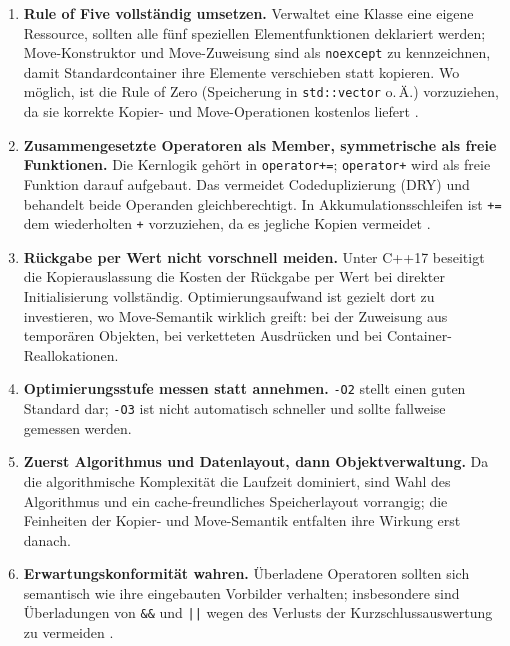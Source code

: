 \documentclass[10pt,a4paper]{article}
\begin{document}
\begin{enumerate}
  \item \textbf{Rule of Five vollständig umsetzen.} Verwaltet eine Klasse eine
  eigene Ressource, sollten alle fünf speziellen Elementfunktionen deklariert
  werden; Move-Konstruktor und Move-Zuweisung sind als \texttt{noexcept} zu
  kennzeichnen, damit Standardcontainer ihre Elemente verschieben statt
  kopieren. Wo möglich, ist die Rule of Zero (Speicherung in
  \texttt{std::vector} o.\,Ä.) vorzuziehen, da sie korrekte Kopier- und
  Move-Operationen kostenlos liefert \cite{meyers2014,coreguidelines}.
 
  \item \textbf{Zusammengesetzte Operatoren als Member, symmetrische als freie
  Funktionen.} Die Kernlogik gehört in \texttt{operator+=}; \texttt{operator+}
  wird als freie Funktion darauf aufgebaut. Das vermeidet Codeduplizierung
  (DRY) und behandelt beide Operanden gleichberechtigt. In
  Akkumulationsschleifen ist \texttt{+=} dem wiederholten \texttt{+}
  vorzuziehen, da es jegliche Kopien vermeidet \cite{sutter2004,meyers2005}.
 
  \item \textbf{Rückgabe per Wert nicht vorschnell meiden.} Unter C++17
  beseitigt die Kopierauslassung die Kosten der Rückgabe per Wert bei direkter
  Initialisierung vollständig. Optimierungsaufwand ist gezielt dort zu
  investieren, wo Move-Semantik wirklich greift: bei der Zuweisung aus
  temporären Objekten, bei verketteten Ausdrücken und bei
  Container-Reallokationen.
 
  \item \textbf{Optimierungsstufe messen statt annehmen.} \texttt{-O2} stellt
  einen guten Standard dar; \texttt{-O3} ist nicht automatisch schneller und
  sollte fallweise gemessen werden.
 
  \item \textbf{Zuerst Algorithmus und Datenlayout, dann Objektverwaltung.} Da
  die algorithmische Komplexität die Laufzeit dominiert, sind Wahl des
  Algorithmus und ein cache-freundliches Speicherlayout vorrangig; die
  Feinheiten der Kopier- und Move-Semantik entfalten ihre Wirkung erst danach.
 
  \item \textbf{Erwartungskonformität wahren.} Überladene Operatoren sollten
  sich semantisch wie ihre eingebauten Vorbilder verhalten; insbesondere sind
  Überladungen von \texttt{\&\&} und \texttt{||} wegen des Verlusts der
  Kurzschlussauswertung zu vermeiden \cite{cppreference,coreguidelines}.
\end{enumerate}
 
\end{document}
